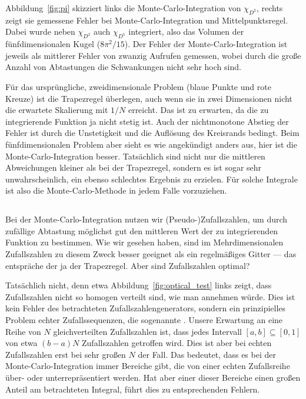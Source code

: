 Abbildung~\ref{fig:pi} skizziert links die Monte-Carlo-Integration von
$\chi_{D^2}$, rechts zeigt sie gemessene Fehler bei
Monte-Carlo-Integration und Mittelpunktsregel. Dabei wurde neben
$\chi_{D^2}$ auch $\chi_{D^5}$ integriert, also das Volumen der
fünfdimensionalen Kugel ($8\pi^2/15$). Der Fehler der
Monte-Carlo-Integration ist jeweils als mittlerer Fehler von zwanzig
Aufrufen gemessen, wobei durch die große Anzahl von Abtastungen die
Schwankungen nicht sehr hoch sind.

Für das ursprüngliche, zweidimensionale Problem (blaue Punkte und rote
Kreuze) ist die Trapezregel überlegen, auch wenn sie in zwei
Dimensionen nicht die erwartete Skalierung mit $1/N$ erreicht. Das ist
zu erwarten, da die zu integrierende Funktion ja nicht stetig
ist. Auch der nichtmonotone Abstieg der Fehler ist durch die
Unstetigkeit und die Auflösung des Kreisrands bedingt. Beim
fünfdimensionalen Problem aber sieht es wie angekündigt anders aus,
hier ist die Monte-Carlo-Integration besser. Tatsächlich sind nicht
nur die mittleren Abweichungen kleiner als bei der Trapezregel,
sondern es ist sogar sehr unwahrscheinlich, ein ebenso schlechtes
Ergebnis zu erzielen. Für solche Integrale ist also die
Monte-Carlo-Methode in jedem Falle vorzuziehen.

\subsection{}

Bei der Monte-Carlo-Integration nutzen wir (Pseudo-)Zufallszahlen, um
durch zufällige Abtastung möglichst gut den mittleren Wert der zu
integrierenden Funktion zu bestimmen. Wie wir gesehen haben, sind im
Mehrdimensionalen Zufallszahlen zu diesem Zweck besser geeignet als
ein regelmäßiges Gitter --- das entspräche der ja der
Trapezregel. Aber sind Zufallszahlen optimal?

Tatsächlich nicht, denn etwa Abbildung~\ref{fig:optical_test} links
zeigt, dass Zufallszahlen nicht so homogen verteilt sind, wie man
annehmen würde. Dies ist kein Fehler des betrachteten
Zufallszahlengenerators, sondern ein prinzipielles Problem echter
Zufallssequenzen, die sogenannte \emph{}. Unsere
Erwartung an eine Reihe von $N$ gleichverteilten Zufallszahlen ist,
dass jedes Intervall $[a,b]\subseteq [0,1]$ von etwa $(b-a)N$
Zufallszahlen getroffen wird. Dies ist aber bei echten Zufallszahlen
erst bei sehr großen $N$ der Fall. Das bedeutet, dass es bei der
Monte-Carlo-Integration immer Bereiche gibt, die von einer echten
Zufallsreihe über- oder unterrepräsentiert werden. Hat aber einer
dieser Bereiche einen großen Anteil am betrachteten Integral, führt
dies zu entsprechenden Fehlern.

